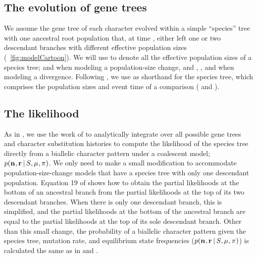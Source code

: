 \subsection{The evolution of gene trees}

We assume the gene tree of each character evolved within a simple ``species''
tree with one ancestral root population that, at time \comparisonetime, either
left one or two descendant branches with different effective population sizes
(\fig{}~\ref{fig:modelCartoon}).
We will use
\comparisonpopsizes{}
to denote all the effective population sizes of a species tree;
\epopsize[\rootpopindex] and 
\epopsize[\descendantpopindex{}] when modeling a population-size change, and
\epopsize[\rootpopindex],
\epopsize[\descendantpopindex{1}],
and \epopsize[\descendantpopindex{2}] when modeling a divergence.
Following \citet{Oaks2018ecoevolity}, we use
\sptree{}
as shorthand for the species tree, which comprises the population sizes and
event time of a comparison
(\comparisonpopsizes{} and \comparisonetime{}).


\subsection{The likelihood}

As in \citet{Oaks2018ecoevolity},
we use the work of \citet{Bryant2012}
to analytically integrate over all possible gene trees and
character substitution histories to compute the likelihood
of the species tree directly from 
a biallelic character pattern under a coalescent model;
$p(\mathbf{n}_{}, \mathbf{r}_{} \,|\, S_{}, \mu_{}, \pi_{})$.
We only need to make a small modification to accommodate population-size-change
models that have a species tree with only one descendant population.
Equation 19 of \citet{Bryant2012} shows how to obtain the partial likelihoods
at the bottom of an ancestral branch from the partial likelihoods at the top of
its two descendant branches.
When there is only one descendant branch, this is simplified, and the partial
likelihoods at the bottom of the ancestral branch are equal to the partial
likelihoods at the top of its sole descendant branch.
Other than this small change, the probability of a biallelic character pattern
given the species tree, mutation rate, and equilibrium state frequencies
($p(\mathbf{n}_{}, \mathbf{r}_{} \,|\, S_{}, \mu_{}, \pi_{})$)
is calculated the same as in \citet{Bryant2012} and \citet{Oaks2018ecoevolity}.


